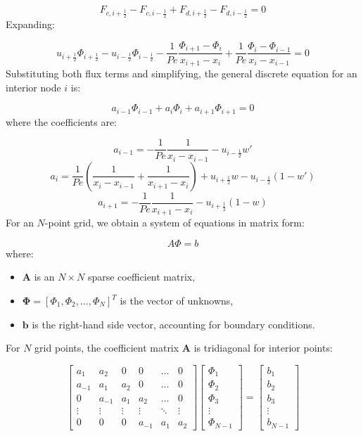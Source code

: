 \documentclass{article}
\begin{document}
\[
F_{c, i+\frac{1}{2}} - F_{c, i-\frac{1}{2}} + F_{d, i+\frac{1}{2}} - F_{d, i-\frac{1}{2}} = 0
\]
Expanding:

\[
u_{i+\frac{1}{2}} \Phi_{i+\frac{1}{2}} - u_{i-\frac{1}{2}} \Phi_{i-\frac{1}{2}} - \frac{1}{Pe} \frac{\Phi_{i+1} - \Phi_i}{x_{i+1} - x_i} + \frac{1}{Pe} \frac{\Phi_i - \Phi_{i-1}}{x_i - x_{i-1}} = 0
\]
Substituting both flux terms and simplifying, the general discrete equation for an interior node \(i\) is:

\[
a_{i-1} \Phi_{i-1} + a_i \Phi_i + a_{i+1} \Phi_{i+1} = 0
\]
where the coefficients are:

\[
a_{i-1} = -\frac{1}{Pe} \frac{1}{x_i - x_{i-1}} - u_{i-\frac{1}{2}} w'
\]
\[
a_i = \frac{1}{Pe} \left( \frac{1}{x_i - x_{i-1}} + \frac{1}{x_{i+1} - x_i} \right) + u_{i+\frac{1}{2}} w - u_{i-\frac{1}{2}} (1 - w')
\]
\[
a_{i+1} = -\frac{1}{Pe} \frac{1}{x_{i+1} - x_i} - u_{i+\frac{1}{2}} (1 - w)
\]
For an \(N\)-point grid, we obtain a system of equations in matrix form:

\[
A \Phi = b
\]
where:
\begin{itemize}
    \item \(\mathbf{A}\) is an \(N \times N\) sparse coefficient matrix,
    \item \(\boldsymbol{\Phi} = [\Phi_1, \Phi_2, \dots, \Phi_N]^T\) is the vector of unknowns,
    \item \(\mathbf{b}\) is the right-hand side vector, accounting for boundary conditions.
\end{itemize}
For \(N\) grid points, the coefficient matrix \(\mathbf{A}\) is tridiagonal for interior points:

\[
\begin{bmatrix}
a_1 & a_2 & 0 & 0 & \dots & 0 \\
a_{-1} & a_1 & a_2 & 0 & \dots & 0 \\
0 & a_{-1} & a_1 & a_2 & \dots & 0 \\
\vdots & \vdots & \vdots & \vdots & \ddots & \vdots \\
0 & 0 & 0 & a_{-1} & a_1 & a_2
\end{bmatrix}
\begin{bmatrix}
\Phi_1 \\
\Phi_2 \\
\Phi_3 \\
\vdots \\
\Phi_{N-1}
\end{bmatrix}
=
\begin{bmatrix}
b_1 \\
b_2 \\
b_3 \\
\vdots \\
b_{N-1}
\end{bmatrix}
\]
\end{document}
